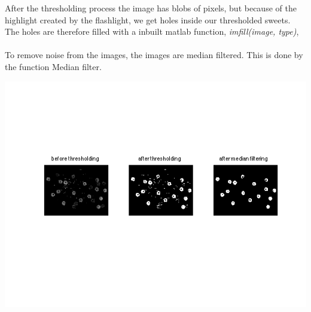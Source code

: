 After the thresholding process the image has blobs of pixels, but because of the highlight created by the flashlight, we get holes inside our thresholded sweets. The holes are therefore filled with a inbuilt matlab function, \emph{imfill(image, type)},
\\

\mbox{}\\
To remove noise from the images, the images are median filtered. This is done by the function Median filter. 
\\


\centerline{\includegraphics[clip=true, trim=40 100 40 80]{separate_step3_1.png}}

